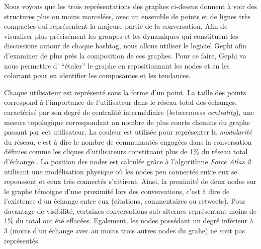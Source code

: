 
  


Nous voyons que les trois représentations des graphes ci-dessus donnent à voir des structures plus ou moins morcelées, avec un ensemble de points et de lignes très compactes qui représentent la majeure partie de la conversation. Afin de visualiser plus précisément les groupes et les dynamiques qui constituent les discussions autour de chaque hashtag, nous allons utiliser le logiciel Gephi \citep{Bastian2009} afin d{\textquoteright}examiner de plus près la composition de ces graphes. Pour ce faire, Gephi va nous permettre d{\textquoteright} {\textquotedblleft}étaler{\textquotedblright} le graphe en repositionnant les nodes et en les coloriant pour en identifier les composantes et les tendances.

Chaque utilisateur est représenté sous la forme d{\textquoteright}un point. La taille des points correspond à l{\textquoteright}importance de l{\textquoteright}utilisateur dans le réseau total des échanges, caractérisé par son degré de centralité intermédiaire (\textit{betweenness centrality}), une mesure topologique correspondant au nombre de plus courts chemins du graphe passant par cet utilisateur. La couleur est utilisée pour représenter la \textit{modularité }du réseau, c{\textquoteright}est à dire le nombre de communautés engagées dans la conversation définies comme les cliques d{\textquoteright}utilisateurs constituant plus de 1\% du réseau total d{\textquoteright}échange \citep{Blondel2008}. La position des nodes est calculée gr\^ace à l{\textquoteright}algorithme \textit{Force Atlas 2} \citep{Bastian2009} utilisant une modélisation physique o\`u les nodes peu connectés entre eux se repoussent et ceux très connectés s{\textquoteright}attirent. Ainsi, la proximité de deux nodes sur le graphe témoigne d{\textquoteright}une proximité lors des conversations, c{\textquoteright}est à dire de l{\textquoteright}existence d{\textquoteright}un échange entre eux (citations, commentaires ou retweets). Pour davantage de visibilité, certaines conversations sub-alternes représentant moins de 1\% du total ont été effacées. Egalement, les nodes possédant un degré inférieur à 3 (moins d{\textquoteright}un échange avec au moins trois autres nodes du grahe) ne sont pas représentés.

